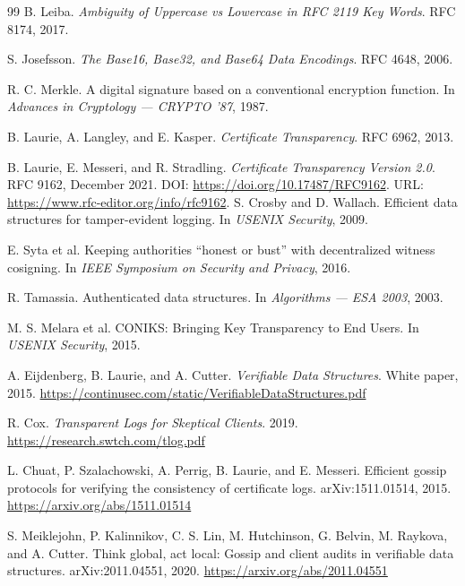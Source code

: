\documentclass[11pt]{article}
\newcommand{\1}{\mathbf{1}}
\theoremstyle{definition}
\theoremstyle{plain}
\begin{document}
\begin{thebibliography}{99}
B. Leiba.
\emph{Ambiguity of Uppercase vs Lowercase in RFC 2119 Key Words}.
RFC 8174, 2017.

S. Josefsson.
\emph{The Base16, Base32, and Base64 Data Encodings}.
RFC 4648, 2006.

R. C. Merkle.
A digital signature based on a conventional encryption function.
In \emph{Advances in Cryptology --- CRYPTO '87}, 1987.

B. Laurie, A. Langley, and E. Kasper.
\emph{Certificate Transparency}.
RFC 6962, 2013.

B. Laurie, E. Messeri, and R. Stradling.
\emph{Certificate Transparency Version 2.0}.
RFC 9162, December 2021. DOI: \url{https://doi.org/10.17487/RFC9162}. URL: \url{https://www.rfc-editor.org/info/rfc9162}.
S. Crosby and D. Wallach.
Efficient data structures for tamper-evident logging.
In \emph{USENIX Security}, 2009.

E. Syta et al.
Keeping authorities ``honest or bust'' with decentralized witness cosigning.
In \emph{IEEE Symposium on Security and Privacy}, 2016.

R. Tamassia.
Authenticated data structures.
In \emph{Algorithms --- ESA 2003}, 2003.

M. S. Melara et al.
CONIKS: Bringing Key Transparency to End Users.
In \emph{USENIX Security}, 2015.


A. Eijdenberg, B. Laurie, and A. Cutter.
\emph{Verifiable Data Structures}.
White paper, 2015.
\href{https://continusec.com/static/VerifiableDataStructures.pdf}{https://continusec.com/static/VerifiableDataStructures.pdf}

R. Cox.
\emph{Transparent Logs for Skeptical Clients}.
2019.
\href{https://research.swtch.com/tlog.pdf}{https://research.swtch.com/tlog.pdf}

L. Chuat, P. Szalachowski, A. Perrig, B. Laurie, and E. Messeri.
Efficient gossip protocols for verifying the consistency of certificate logs.
arXiv:1511.01514, 2015.
\href{https://arxiv.org/abs/1511.01514}{https://arxiv.org/abs/1511.01514}

S. Meiklejohn, P. Kalinnikov, C. S. Lin, M. Hutchinson, G. Belvin, M. Raykova, and A. Cutter.
Think global, act local: Gossip and client audits in verifiable data structures.
arXiv:2011.04551, 2020.
\href{https://arxiv.org/abs/2011.04551}{https://arxiv.org/abs/2011.04551}


\end{thebibliography}
\end{document}

